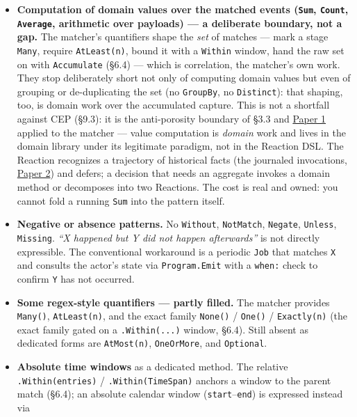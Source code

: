\documentclass[
]{article}
\providecommand{\tightlist}{%
  \setlength{\itemsep}{0pt}\setlength{\parskip}{0pt}}
\let\origtexttt\texttt%
\renewcommand{\texttt}[1]{\origtexttt{\seqsplit{#1}}}%
\let\texttt\origtexttt%
\begin{document}
\begin{itemize}
\tightlist
\item
  \textbf{Computation of domain values over the matched events
  (\texttt{Sum}, \texttt{Count}, \texttt{Average}, arithmetic over
  payloads) --- a deliberate boundary, not a gap.} The matcher's
  quantifiers shape the \emph{set} of matches --- mark a stage
  \texttt{Many}, require \texttt{AtLeast(n)}, bound it with a
  \texttt{Within} window, hand the raw set on with \texttt{Accumulate}
  (§6.4) --- which is correlation, the matcher's own work. They stop
  deliberately short not only of computing domain values but even of
  grouping or de-duplicating the set (no \texttt{GroupBy}, no
  \texttt{Distinct}): that shaping, too, is domain work over the
  accumulated capture. This is not a shortfall against CEP (§9.3): it is
  the anti-porosity boundary of §3.3 and
  \href{01-anti-porosity.md}{Paper 1} applied to the matcher --- value
  computation is \emph{domain} work and lives in the domain library
  under its legitimate paradigm, not in the Reaction DSL. The Reaction
  recognizes a trajectory of historical facts (the journaled
  invocations, \href{02-program-value-separability.md}{Paper 2}) and
  defers; a decision that needs an aggregate invokes a domain method or
  decomposes into two Reactions. The cost is real and owned: you cannot
  fold a running \texttt{Sum} into the pattern itself.
\item
  \textbf{Negative or absence patterns.} No \texttt{Without},
  \texttt{NotMatch}, \texttt{Negate}, \texttt{Unless}, \texttt{Missing}.
  \emph{``X happened but Y did not happen afterwards''} is not directly
  expressible. The conventional workaround is a periodic \texttt{Job}
  that matches \texttt{X} and consults the actor's state via
  \texttt{Program.Emit} with a \texttt{when:} check to confirm
  \texttt{Y} has not occurred.
\item
  \textbf{Some regex-style quantifiers --- partly filled.} The matcher
  provides \texttt{Many()}, \texttt{AtLeast(n)}, and the exact family
  \texttt{None()} / \texttt{One()} / \texttt{Exactly(n)} (the exact
  family gated on a \texttt{.Within(...)} window, §6.4). Still absent as
  dedicated forms are \texttt{AtMost(n)}, \texttt{OneOrMore}, and
  \texttt{Optional}.
\item
  \textbf{Absolute time windows} as a dedicated method. The relative
  \texttt{.Within(entries)} / \texttt{.Within(TimeSpan)} anchors a
  window to the parent match (§6.4); an absolute calendar window
  (\texttt{start}--\texttt{end}) is expressed instead via

\end{itemize}
\end{document}
